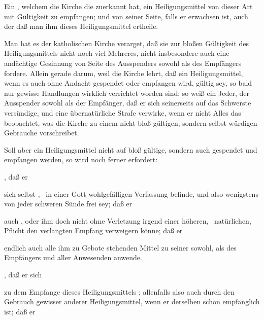 \begin{aufza}
\begin{aufzb}
\item Ein , welchem die Kirche die  zuerkannt hat, ein Heiligungsmittel von dieser Art mit Gültigkeit zu empfangen; und von seiner Seite, falls er erwachsen ist, auch der  daß man ihm dieses Heiligungsmittel ertheile.
\end{aufzb}
\begin{RWanm} 
Man hat es der katholischen Kirche verarget, daß sie zur bloßen Gültigkeit des Heiligungsmittels nicht noch viel Mehreres, nicht insbesondere auch eine andächtige Gesinnung von Seite des Ausspenders sowohl als des Empfängers fordere. Allein gerade darum, weil die Kirche lehrt, daß ein Heiligungsmittel, wenn es auch ohne Andacht gespendet oder empfangen wird, gültig sey, so bald nur gewisse Handlungen wirklich verrichtet worden sind: so weiß ein Jeder, der Ausspender sowohl als der Empfänger, daß er sich seinerseits auf das Schwerste versündige, und eine übernatürliche Strafe verwirke, wenn er nicht Alles das beobachtet, was die Kirche zu einem nicht bloß gültigen, sondern selbst würdigen Gebrauche vorschreibet. 
\end{RWanm} 
\item Soll aber ein Heiligungsmittel nicht auf bloß gültige, sondern auch  gespendet und empfangen werden, so wird noch ferner erfordert:
\begin{aufzb}
\item {}, daß er
\begin{aufzc}
\item sich selbst , \dh\  in einer Gott wohlgefälligen Verfassung befinde, und also wenigstens von jeder schweren Sünde frei sey; daß er
\item auch , oder ihm doch nicht ohne Verletzung irgend einer höheren, \zB\  natürlichen, Pflicht den verlangten Empfang verweigern könne; daß er
\item endlich auch alle ihm zu Gebote stehenden Mittel zu seiner sowohl, als des Empfängers und aller Anwesenden  anwende. 
\end{aufzc}
\item {}, daß er sich
\begin{aufzc}
\item zu dem Empfange dieses Heiligungsmittels ; allenfalls also auch durch den Gebrauch gewisser anderer Heiligungsmittel, wenn er derselben schon empfänglich ist; daß er

\end{aufzc}
\end{aufzb}
\end{aufza}
